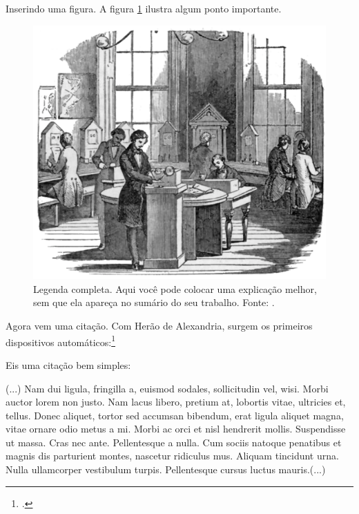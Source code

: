 \documentclass[
	12pt,				%
	openright,			%
	twoside,			%
	a4paper,			%
	english,			%
	brazil				%
	]{abntex2}
\begin{document}
Inserindo uma figura. A figura \ref{fig:308} ilustra algum ponto importante.
\begin{figure}[htbp]
	\centering
	\includegraphics[scale=0.3]{fig09.pdf} %
	\caption[Legenda reduzida - aparece no sumario]{Legenda completa. Aqui você pode colocar uma explicação melhor, sem que ela apareça no sumário do seu trabalho. Fonte: \cite[p.~117]{boyle1772}.}
	\label{fig:308}
\end{figure}

Agora vem uma citação. Com Herão de Alexandria, surgem os primeiros dispositivos automáticos:\footcite{herao}

Eis uma citação bem simples:
\begin{citacao}
	(...) Nam dui ligula, fringilla a, euismod sodales, sollicitudin vel, wisi. Morbi auctor lorem non justo. Nam lacus libero, pretium at, lobortis vitae, ultricies et, tellus. Donec aliquet, tortor sed accumsan bibendum, erat ligula aliquet magna, vitae ornare odio metus a mi. Morbi ac orci et nisl hendrerit mollis. Suspendisse ut massa. Cras nec ante. Pellentesque a nulla. Cum sociis natoque penatibus et magnis dis parturient montes, nascetur ridiculus mus. Aliquam tincidunt urna. Nulla
	ullamcorper vestibulum turpis. Pellentesque cursus luctus mauris.(...)
\end{citacao}

\lipsum[30]
\end{document}
